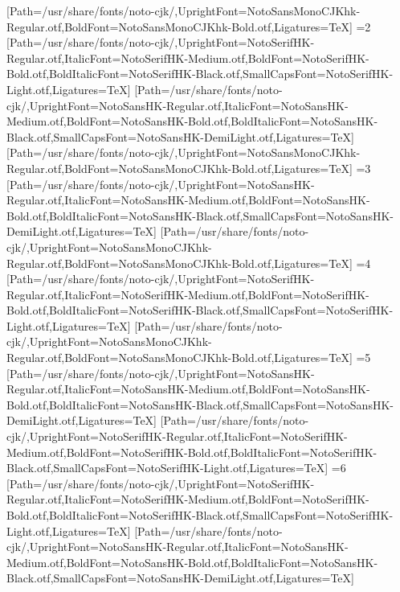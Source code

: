 [Path=/usr/share/fonts/noto-cjk/,UprightFont=NotoSansMonoCJKhk-Regular.otf,BoldFont=NotoSansMonoCJKhk-Bold.otf,Ligatures=TeX]
\else\ifnum\value{CJKFonts}=2
[Path=/usr/share/fonts/noto-cjk/,UprightFont=NotoSerifHK-Regular.otf,ItalicFont=NotoSerifHK-Medium.otf,BoldFont=NotoSerifHK-Bold.otf,BoldItalicFont=NotoSerifHK-Black.otf,SmallCapsFont=NotoSerifHK-Light.otf,Ligatures=TeX]
[Path=/usr/share/fonts/noto-cjk/,UprightFont=NotoSansHK-Regular.otf,ItalicFont=NotoSansHK-Medium.otf,BoldFont=NotoSansHK-Bold.otf,BoldItalicFont=NotoSansHK-Black.otf,SmallCapsFont=NotoSansHK-DemiLight.otf,Ligatures=TeX]
[Path=/usr/share/fonts/noto-cjk/,UprightFont=NotoSansMonoCJKhk-Regular.otf,BoldFont=NotoSansMonoCJKhk-Bold.otf,Ligatures=TeX]
\else\ifnum\value{CJKFonts}=3
[Path=/usr/share/fonts/noto-cjk/,UprightFont=NotoSansHK-Regular.otf,ItalicFont=NotoSansHK-Medium.otf,BoldFont=NotoSansHK-Bold.otf,BoldItalicFont=NotoSansHK-Black.otf,SmallCapsFont=NotoSansHK-DemiLight.otf,Ligatures=TeX]
[Path=/usr/share/fonts/noto-cjk/,UprightFont=NotoSansMonoCJKhk-Regular.otf,BoldFont=NotoSansMonoCJKhk-Bold.otf,Ligatures=TeX]
\else\ifnum\value{CJKFonts}=4
[Path=/usr/share/fonts/noto-cjk/,UprightFont=NotoSerifHK-Regular.otf,ItalicFont=NotoSerifHK-Medium.otf,BoldFont=NotoSerifHK-Bold.otf,BoldItalicFont=NotoSerifHK-Black.otf,SmallCapsFont=NotoSerifHK-Light.otf,Ligatures=TeX]
[Path=/usr/share/fonts/noto-cjk/,UprightFont=NotoSansMonoCJKhk-Regular.otf,BoldFont=NotoSansMonoCJKhk-Bold.otf,Ligatures=TeX]
\else\ifnum\value{CJKFonts}=5
[Path=/usr/share/fonts/noto-cjk/,UprightFont=NotoSansHK-Regular.otf,ItalicFont=NotoSansHK-Medium.otf,BoldFont=NotoSansHK-Bold.otf,BoldItalicFont=NotoSansHK-Black.otf,SmallCapsFont=NotoSansHK-DemiLight.otf,Ligatures=TeX]
[Path=/usr/share/fonts/noto-cjk/,UprightFont=NotoSerifHK-Regular.otf,ItalicFont=NotoSerifHK-Medium.otf,BoldFont=NotoSerifHK-Bold.otf,BoldItalicFont=NotoSerifHK-Black.otf,SmallCapsFont=NotoSerifHK-Light.otf,Ligatures=TeX]
\else\ifnum\value{CJKFonts}=6
[Path=/usr/share/fonts/noto-cjk/,UprightFont=NotoSerifHK-Regular.otf,ItalicFont=NotoSerifHK-Medium.otf,BoldFont=NotoSerifHK-Bold.otf,BoldItalicFont=NotoSerifHK-Black.otf,SmallCapsFont=NotoSerifHK-Light.otf,Ligatures=TeX]
[Path=/usr/share/fonts/noto-cjk/,UprightFont=NotoSansHK-Regular.otf,ItalicFont=NotoSansHK-Medium.otf,BoldFont=NotoSansHK-Bold.otf,BoldItalicFont=NotoSansHK-Black.otf,SmallCapsFont=NotoSansHK-DemiLight.otf,Ligatures=TeX]

